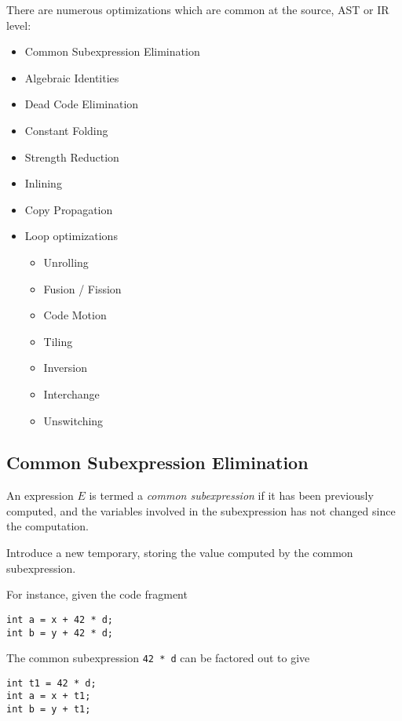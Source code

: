 \begin{definition}
    There are numerous optimizations which are common at the source, AST or IR level:
    \begin{itemize}
        \item Common Subexpression Elimination
        \item Algebraic Identities
        \item Dead Code Elimination
        \item Constant Folding
        \item Strength Reduction
        \item Inlining
        \item Copy Propagation
        \item Loop optimizations
        \begin{itemize}
            \item Unrolling
            \item Fusion / Fission
            \item Code Motion
            \item Tiling
            \item Inversion
            \item Interchange
            \item Unswitching
        \end{itemize}
    \end{itemize}
\end{definition}

\subsection{Common Subexpression Elimination}

\begin{definition}
    An expression $E$ is termed a \textit{common subexpression} if it has been previously computed, and the variables involved in the subexpression has not changed since the computation.
\end{definition}

\begin{definition}
    Introduce a new temporary, storing the value computed by the common subexpression.
\end{definition}

\begin{example}
    For instance, given the code fragment
    \begin{verbatim}
int a = x + 42 * d;
int b = y + 42 * d;
    \end{verbatim}
    
    The common subexpression \texttt{42 * d} can be factored out to give
    \begin{verbatim}
int t1 = 42 * d;
int a = x + t1;
int b = y + t1;
    \end{verbatim}
\end{example}

